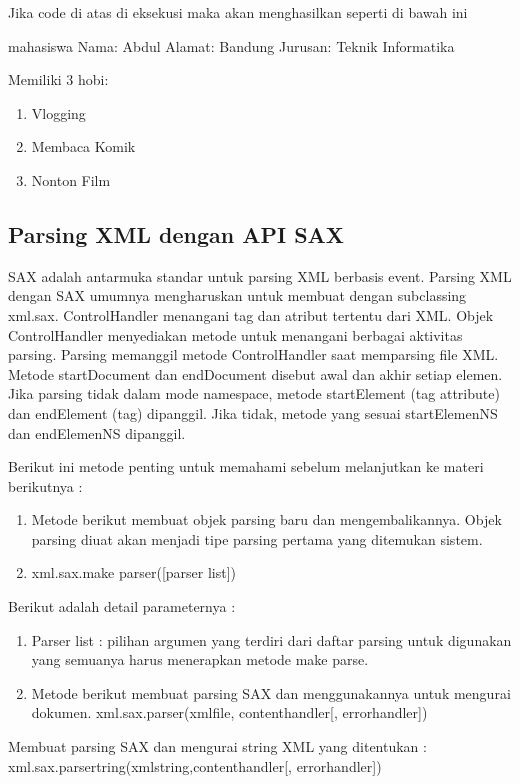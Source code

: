 Jika code di atas di eksekusi maka akan menghasilkan seperti di bawah ini

mahasiswa
Nama: Abdul
Alamat: Bandung
Jurusan: Teknik Informatika

Memiliki 3 hobi:
\begin{enumerate}
  \item Vlogging
  \item Membaca Komik
  \item Nonton Film
\end{enumerate}

\subsection{Parsing XML dengan API SAX}
  SAX adalah antarmuka standar untuk parsing XML berbasis event. Parsing XML dengan SAX umumnya mengharuskan untuk membuat dengan subclassing xml.sax.
  ControlHandler menangani tag dan atribut tertentu dari XML. Objek ControlHandler menyediakan metode untuk menangani berbagai aktivitas parsing. Parsing memanggil metode ControlHandler saat memparsing file XML.
  Metode startDocument dan endDocument disebut awal dan akhir setiap elemen. Jika parsing tidak dalam mode namespace, metode startElement (tag attribute) dan endElement (tag) dipanggil. Jika tidak, metode yang sesuai startElemenNS dan endElemenNS dipanggil. 

Berikut ini metode penting untuk memahami sebelum melanjutkan ke materi berikutnya : 
\begin{enumerate}
  \item Metode berikut membuat objek parsing baru dan mengembalikannya. Objek parsing diuat akan menjadi tipe parsing pertama yang ditemukan sistem.
  \item xml.sax.make parser([parser list])
\end{enumerate}

Berikut adalah detail parameternya : 
\begin{enumerate}
  \item Parser list : pilihan argumen yang terdiri dari daftar parsing untuk digunakan yang semuanya harus menerapkan metode {make    parse}.
  \item Metode berikut membuat parsing SAX dan menggunakannya untuk mengurai dokumen. xml.sax.parser(xmlfile, contenthandler[, errorhandler])
\end{enumerate}

Membuat parsing SAX dan mengurai string XML yang ditentukan : 
xml.sax.parsertring(xmlstring,contenthandler[, errorhandler])

